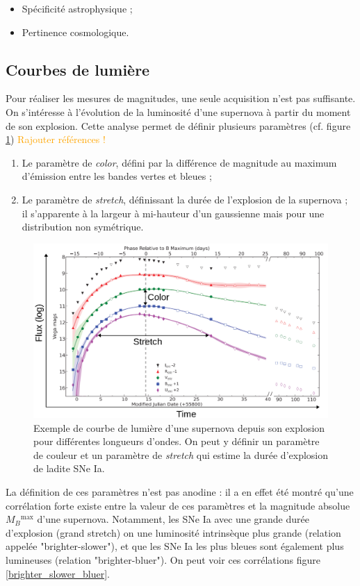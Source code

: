 \documentclass[a4paper, 12pt, svgnames]{article}
\begin{document}
\begin{itemize}
    \item Spécificité astrophysique ;
    \item Pertinence cosmologique.
\end{itemize}

\subsection{Courbes de lumière}
Pour réaliser les mesures de magnitudes, une seule acquisition n'est pas
suffisante. On s'intéresse à l'évolution de la luminosité d'une supernova à
partir du moment de son explosion. Cette analyse permet de définir plusieurs
paramètres (cf. figure \ref{lightcurves}) \textcolor{orange}{Rajouter
références !}

\begin{enumerate}
    \item Le paramètre de \textit{color}, défini par la différence de magnitude
        au maximum d'émission entre les bandes vertes et bleues ;
    \item Le paramètre de \textit{stretch}, définissant la durée de l'explosion
        de la supernova ; il s'apparente à la largeur à mi-hauteur d'un
        gaussienne mais pour une distribution non symétrique.
\end{enumerate}

\begin{figure}[htbp!]
    \centering
    \includegraphics[width=.5\linewidth]{Rapport_figures/lightcurve.png}
    \captionsetup{justification=centering}
    \caption{Exemple de courbe de lumière d'une supernova depuis son explosion
    pour différentes longueurs d'ondes. On peut y définir un paramètre de
couleur et un paramètre de \textit{stretch} qui estime la durée d'explosion de
ladite SNe Ia.}
    \label{lightcurves}
\end{figure}

La définition de ces paramètres n'est pas anodine : il a en effet été montré
qu'une corrélation forte existe entre la valeur de ces paramètres et la
magnitude absolue $M_B{}^{\text{max}}$ d'une supernova. Notamment, les SNe Ia
avec une grande durée d'explosion (grand stretch) on une luminosité intrinsèque
plus grande (relation appelée "brighter-slower"), et que les SNe Ia les plus
bleues sont également plus lumineuses (relation "brighter-bluer"). On peut voir
ces corrélations figure \ref{brighter_slower_bluer}.
\end{document}
